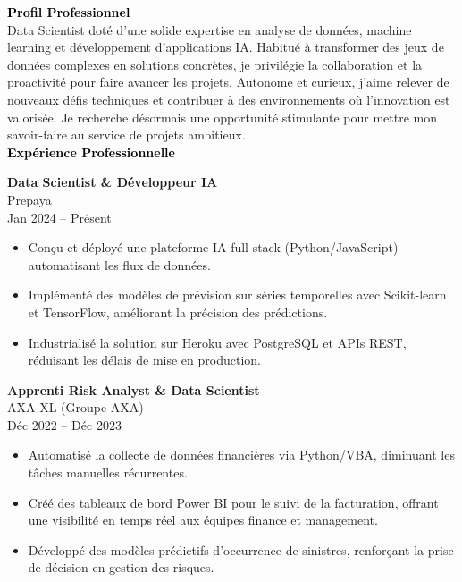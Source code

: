 \documentclass{article}
\begin{document}
\begin{paracol}{2}
\switchcolumn
\color{black}

\textcolor{black}{\Large \textbf{Profil Professionnel}} \\[2pt]
Data Scientist doté d’une solide expertise en analyse de données, machine learning et développement d’applications IA. Habitué à transformer des jeux de données complexes en solutions concrètes, je privilégie la collaboration et la proactivité pour faire avancer les projets. Autonome et curieux, j’aime relever de nouveaux défis techniques et contribuer à des environnements où l’innovation est valorisée. Je recherche désormais une opportunité stimulante pour mettre mon savoir-faire au service de projets ambitieux. \\[8pt]

\textcolor{black}{\Large \textbf{Expérience Professionnelle}} \\[2pt]

\colorbox{maincolor}{%
  \begin{minipage}{\linewidth}
    \textbf{Data Scientist \& Développeur IA} \\ Prepaya \\ Jan 2024 – Présent
    \begin{itemize}
      \item Conçu et déployé une plateforme IA full-stack (Python/JavaScript) automatisant les flux de données. \item Implémenté des modèles de prévision sur séries temporelles avec Scikit-learn et TensorFlow, améliorant la précision des prédictions. \item Industrialisé la solution sur Heroku avec PostgreSQL et APIs REST, réduisant les délais de mise en production.
    \end{itemize}
  \end{minipage}}

\vspace{3mm}


\colorbox{maincolor}{%
  \begin{minipage}{\linewidth}
    \textbf{Apprenti Risk Analyst \& Data Scientist} \\ AXA XL (Groupe AXA) \\ Déc 2022 – Déc 2023
    \begin{itemize}
      \item Automatisé la collecte de données financières via Python/VBA, diminuant les tâches manuelles récurrentes. \item Créé des tableaux de bord Power BI pour le suivi de la facturation, offrant une visibilité en temps réel aux équipes finance et management. \item Développé des modèles prédictifs d’occurrence de sinistres, renforçant la prise de décision en gestion des risques.
    \end{itemize}
  \end{minipage}}


\end{paracol}
\end{document}
